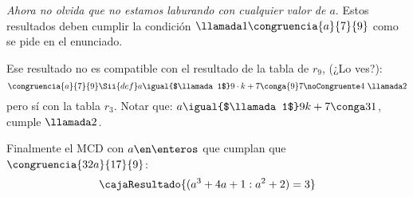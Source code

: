 \textit{Ahora no olvida que no estamos laburando con cualquier valor de $a$}.
Estos resultados deben cumplir la condición $\llamada1 \congruencia{a}{7}{9}$ como se pide en el enunciado.

Ese resultado no es compatible con el resultado de la tabla de $r_9$, (¿Lo ves?):
$$
  \congruencia{a}{7}{9}
  \Sii{def}
  a \igual{$\llamada1$} 9\cdot k + 7 \conga{9} 7 \noCongruente 4 \ \llamada2
$$
pero sí con la tabla $r_3$.
Notar que: $a \igual{$\llamada1$} 9k + 7 \conga3 1$, cumple $\llamada2$.

\bigskip

Finalmente el MCD con $a \en \enteros$ que cumplan que $\congruencia{32a}{17}{9}$:
$$
  \cajaResultado{
    (a^3 + 4a + 1 : a^2 + 2) = 3
  }
$$

\begin{aportes}
  \item {}
\end{aportes}
